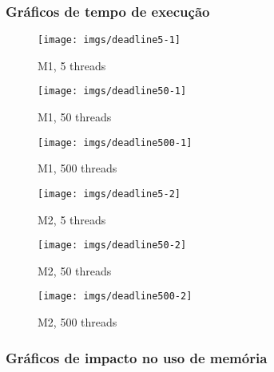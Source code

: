 \documentclass{beamer}
\begin{document}
\begin{frame}
\frametitle{Gráficos de tempo de execução}


\begin{figure}[!htb]
  \texttt{[image: imgs/deadline5-1]}
  \caption{M1, 5 threads}\label{fig:awesome_image1}
\endminipage\hfill
{}
  \texttt{[image: imgs/deadline50-1]}
  \caption{M1, 50 threads}\label{fig:awesome_image2}
\endminipage\hfill
{}%
  \texttt{[image: imgs/deadline500-1]}
  \caption{M1, 500 threads}\label{fig:awesome_image3}
\endminipage
\end{figure}



\begin{figure}[!htb]
  \texttt{[image: imgs/deadline5-2]}
  \caption{M2, 5 threads}\label{fig:awesome_image1}
\endminipage\hfill
{}
  \texttt{[image: imgs/deadline50-2]}
  \caption{M2, 50 threads}\label{fig:awesome_image2}
\endminipage\hfill
{}%
  \texttt{[image: imgs/deadline500-2]}
  \caption{M2, 500 threads}\label{fig:awesome_image3}
\endminipage
\end{figure}


\end{frame}


\begin{frame}
\frametitle{Gráficos de impacto no uso de memória}

\end{frame}



\end{document}
